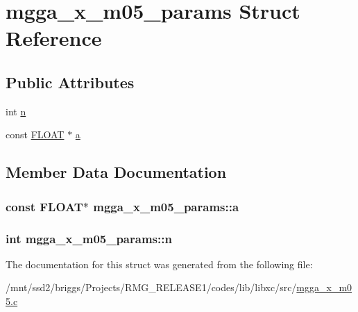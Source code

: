 \hypertarget{structmgga__x__m05__params}{\section{mgga\-\_\-x\-\_\-m05\-\_\-params Struct Reference}
\label{structmgga__x__m05__params}
}
\subsection*{Public Attributes}
\begin{DoxyCompactItemize}
\item 
int \hyperlink{structmgga__x__m05__params_a78c9a1d7e7d7f3aa8b527728e1dfdb5d}{n}
\item 
const \hyperlink{src_2xc__config_8h_ae8690abbffa85934d64d545920e2b108}{F\-L\-O\-A\-T} $\ast$ \hyperlink{structmgga__x__m05__params_a85a074e44178d519a2d74f248995fe9b}{a}
\end{DoxyCompactItemize}


\subsection{Member Data Documentation}
\hypertarget{structmgga__x__m05__params_a85a074e44178d519a2d74f248995fe9b}{
\subsubsection[{a}]{\setlength{\rightskip}{0pt plus 5cm}const {\bf F\-L\-O\-A\-T}$\ast$ mgga\-\_\-x\-\_\-m05\-\_\-params\-::a}}\label{structmgga__x__m05__params_a85a074e44178d519a2d74f248995fe9b}
\hypertarget{structmgga__x__m05__params_a78c9a1d7e7d7f3aa8b527728e1dfdb5d}{
\subsubsection[{n}]{\setlength{\rightskip}{0pt plus 5cm}int mgga\-\_\-x\-\_\-m05\-\_\-params\-::n}}\label{structmgga__x__m05__params_a78c9a1d7e7d7f3aa8b527728e1dfdb5d}


The documentation for this struct was generated from the following file\-:\begin{DoxyCompactItemize}
\item 
/mnt/ssd2/briggs/\-Projects/\-R\-M\-G\-\_\-\-R\-E\-L\-E\-A\-S\-E1/codes/lib/libxc/src/\hyperlink{mgga__x__m05_8c}{mgga\-\_\-x\-\_\-m05.\-c}\end{DoxyCompactItemize}
